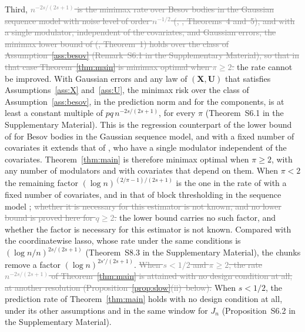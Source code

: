 \documentclass[12pt]{article} %
\theoremstyle{definition}
\theoremstyle{plain}
\newcommand{\bX}{\mathbf{X}}
\newcommand{\bU}{\mathbf{U}}
\newcommand{\seff}{s'}
\begin{document}
\textcolor{colR1}{Third, \textcolor{gray}{\sout{$n^{-2s/(2s+1)}$ is the minimax rate over Besov bodies
in the Gaussian sequence model with noise level of order $n^{-1/2}$
(\mbox{\citeauthor{Donoho-Johnstone-1998}}, \mbox{\citeyear{Donoho-Johnstone-1998}}, Theorems~4 and~5), and with a single modulator,
independent of the covariates, and Gaussian errors, the minimax lower bound of
\mbox{\citeauthor{Klopp-Pensky-2015}} (\mbox{\citeyear{Klopp-Pensky-2015}}, Theorem~1) holds over the class of
\mbox{Assumption~\ref{ass:besov}} (Remark~S6.1 in the Supplementary Material), so that
in that case \mbox{Theorem~\ref{thm:main}} is minimax optimal when $\pi \ge 2$.}} the rate
cannot be improved. With Gaussian errors and any law of $(\bX,\bU)$ that
satisfies Assumptions~\ref{ass:X} and~\ref{ass:U}, the minimax risk over the
class of Assumption~\ref{ass:besov}, in the prediction norm and for the
components, is at least a constant multiple of $pq\,n^{-2s/(2s+1)}$, for every
$\pi$ (Theorem~S6.1 in the Supplementary Material). This is the regression
counterpart of the lower bound of \citet[Theorem~5]{Donoho-Johnstone-1998} for
Besov bodies in the Gaussian sequence model, and with a fixed number of
covariates it extends that of \citet[Theorem~1]{Klopp-Pensky-2015}, who have a
single modulator independent of the covariates. Theorem~\ref{thm:main} is
therefore minimax optimal when $\pi \ge 2$, with any number of modulators and
with covariates that depend on them. When
$\pi < 2$ the remaining factor $(\log n)^{(2/\pi-1)/(2s+1)}$ is the one in the
rate of \citet[eq.~3.19]{Klopp-Pensky-2015} with a fixed number of covariates,
and in that of block thresholding in the sequence model
\citep[Theorem~4]{Cai-1999}; \textcolor{gray}{\sout{whether it is necessary for this estimator is not
known, and no lower bound is proved here for $q \ge 2$.}} the lower bound carries
no such factor, and whether the factor is necessary for this estimator is not
known. Compared with the
coordinatewise lasso, whose rate under the same conditions is
$(\log n/n)^{2s/(2s+1)}$ (Theorem~S8.3 in the Supplementary Material), the
chunks remove a factor $(\log n)^{2\seff/(2s+1)}$.
\textcolor{gray}{\sout{When $s < 1/2$ and
$\pi \ge 2$, the rate $n^{-2s/(2s+1)}$ of \mbox{Theorem~\ref{thm:main}} is attained
with no design condition at all, at another resolution
\mbox{(Proposition~\ref{prop:slow}(ii) below)}.}} When $s < 1/2$, the prediction
rate of Theorem~\ref{thm:main} holds with no design condition at all, under
its other assumptions and in the same window for $J_{n}$ (Proposition~S6.2
in the Supplementary Material).}
\end{document}
